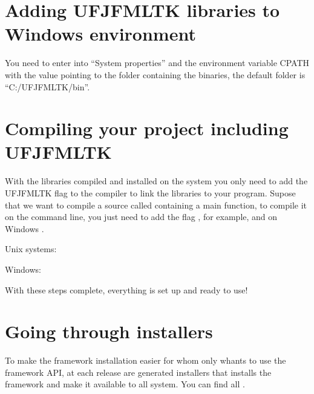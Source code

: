 \documentclass[letterpaper,10pt,english]{sphinxmanual}
\begin{document}
\section{Adding UFJF\sphinxhyphen{}MLTK libraries to Windows environment}
\label{\detokenize{getting_started/installation:adding-ufjf-mltk-libraries-to-windows-environment}}
\sphinxAtStartPar
You need to enter into “System properties” and the environment variable CPATH with the value pointing to the folder containing the binaries, the default folder is “C:/UFJF\sphinxhyphen{}MLTK/bin”.


\section{Compiling your project including UFJF\sphinxhyphen{}MLTK}
\label{\detokenize{getting_started/installation:compiling-your-project-including-ufjf-mltk}}
\sphinxAtStartPar
With the libraries compiled and installed on the system you only need to add the UFJF\sphinxhyphen{}MLTK flag to the compiler to link the libraries to your program. Supose that we want to compile a source called  containing a main function, to compile it on the command line, you just need to add the flag , for example,  and on Windows .

\sphinxAtStartPar
Unix systems: 

\sphinxAtStartPar
Windows: 

\sphinxAtStartPar
With these steps complete, everything is set up and ready to use!


\section{Going through installers}
\label{\detokenize{getting_started/installation:going-through-installers}}
\sphinxAtStartPar
To make the framework installation easier for whom only whants to use the framework API, at each release are generated
installers that installs the framework and make it available to all system. You can find all .
\end{document}
